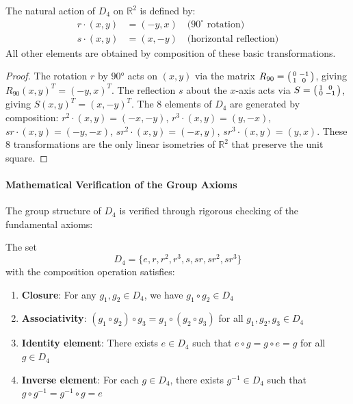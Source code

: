\begin{proposition}
The natural action of $D_4$ on $\mathbb{R}^2$ is defined by:
\begin{align}
r \cdot (x,y) &= (-y, x) \quad \text{($90^\circ$ rotation)} \\
s \cdot (x,y) &= (x, -y) \quad \text{(horizontal reflection)}
\end{align}
All other elements are obtained by composition of these basic transformations.
\end{proposition}

\begin{proof}
The rotation $r$ by $90°$ acts on $(x,y)$ via the matrix $R_{90} = \begin{psmallmatrix} 0 & -1 \\ 1 & 0 \end{psmallmatrix}$, giving $R_{90}(x,y)^T = (-y,x)^T$. The reflection $s$ about the $x$-axis acts via $S = \begin{psmallmatrix} 1 & 0 \\ 0 & -1 \end{psmallmatrix}$, giving $S(x,y)^T = (x,-y)^T$. The 8 elements of $D_4$ are generated by composition: $r^2 \cdot (x,y) = (-x,-y)$, $r^3 \cdot (x,y) = (y,-x)$, $sr \cdot (x,y) = (-y,-x)$, $sr^2 \cdot (x,y) = (-x,y)$, $sr^3 \cdot (x,y) = (y,x)$. These 8 transformations are the only linear isometries of $\mathbb{R}^2$ that preserve the unit square.
\end{proof}

\paragraph{Mathematical Verification of the Group Axioms}

The group structure of $D_4$ is verified through rigorous checking of the fundamental axioms:

\begin{theorem}[Axioms of $D_4$]
The set 
\[
D_4 = \{e, r, r^2, r^3, s, sr, sr^2, sr^3\}
\]
 with the composition operation satisfies:

\begin{enumerate}
    \item \textbf{Closure}: For any $g_1, g_2 \in D_4$, we have $g_1 \circ g_2 \in D_4$
    \item \textbf{Associativity}: $(g_1 \circ g_2) \circ g_3 = g_1 \circ (g_2 \circ g_3)$ for all $g_1, g_2, g_3 \in D_4$
    \item \textbf{Identity element}: There exists $e \in D_4$ such that $e \circ g = g \circ e = g$ for all $g \in D_4$
    \item \textbf{Inverse element}: For each $g \in D_4$, there exists $g^{-1} \in D_4$ such that $g \circ g^{-1} = g^{-1} \circ g = e$
\end{enumerate}
\end{theorem}

